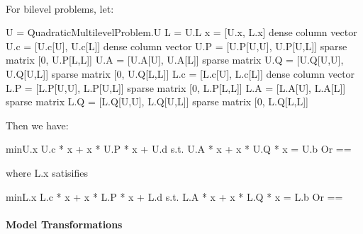 \documentclass[letterpaper,10pt,english]{sphinxmanual}
\begin{document}
\begin{fulllineitems}
\label{\detokenize{reference/mpr:pao.mpr.repn.QuadraticMultilevelProblem}}~
\begin{sphinxVerbatim}[commandchars=\\\{\}]
For bilevel problems, let:

  U   = QuadraticMultilevelProblem.U
  L   = U.L
  x   = [U.x, L.x]\PYGZsq{}           \PYGZsh{} dense column vector
  U.c = [U.c[U], U.c[L]]\PYGZsq{}     \PYGZsh{} dense column vector
  U.P = [U.P[U,U], U.P[U,L]]  \PYGZsh{} sparse matrix
        [0,        U.P[L,L]]
  U.A = [U.A[U], U.A[L]]      \PYGZsh{} sparse matrix
  U.Q = [U.Q[U,U], U.Q[U,L]]  \PYGZsh{} sparse matrix
        [0,        U.Q[L,L]]
  L.c = [L.c[U], L.c[L]]\PYGZsq{}     \PYGZsh{} dense column vector
  L.P = [L.P[U,U], L.P[U,L]]  \PYGZsh{} sparse matrix
        [0,        L.P[L,L]]
  L.A = [L.A[U], L.A[L]]      \PYGZsh{} sparse matrix
  L.Q = [L.Q[U,U], L.Q[U,L]]  \PYGZsh{} sparse matrix
        [0,        L.Q[L,L]]

Then we have:

  min\PYGZus{}\PYGZob{}U.x\PYGZcb{}   U.c\PYGZsq{} * x + x\PYGZsq{} * U.P * x + U.d
  s.t.        U.A  * x + x\PYGZsq{} * U.Q * x       \PYGZlt{}= U.b                 \PYGZsh{} Or ==

          where L.x satisifies

              min\PYGZus{}\PYGZob{}L.x\PYGZcb{}   L.c\PYGZsq{} * x + x\PYGZsq{} * L.P * x + L.d
              s.t.        L.A  * x + x\PYGZsq{} * L.Q * x       \PYGZlt{}= L.b     \PYGZsh{} Or ==
\end{sphinxVerbatim}

\end{fulllineitems}



\paragraph{Model Transformations}
\label{\detokenize{reference/mpr:model-transformations}}
\end{document}
